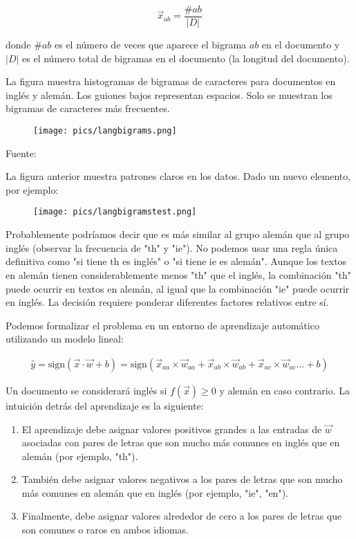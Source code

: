 \begin{equation}
\vec{x}_{ab} = \frac{\#ab}{|D|}
\end{equation}

donde $\#ab$ es el número de veces que aparece el bigrama $ab$ en el documento y $|D|$ es el número total de bigramas en el documento (la longitud del documento).

La figura muestra histogramas de bigramas de caracteres para documentos en inglés y alemán. Los guiones bajos representan espacios. Solo se muestran los bigramas de caracteres más frecuentes.

\begin{figure}[htb]
	\centering
	 \texttt{[image: pics/langbigrams.png]}
\end{figure}

Fuente: \cite{goldberg2017neural}

La figura anterior muestra patrones claros en los datos. Dado un nuevo elemento, por ejemplo:

\begin{figure}[htb]
	\centering
	 \texttt{[image: pics/langbigramstest.png]}
\end{figure}

Probablemente podríamos decir que es más similar al grupo alemán que al grupo inglés (observar la frecuencia de "th" y "ie"). No podemos usar una regla única definitiva como "si tiene th es inglés" o "si tiene ie es alemán". Aunque los textos en alemán tienen considerablemente menos "th" que el inglés, la combinación "th" puede ocurrir en textos en alemán, al igual que la combinación "ie" puede ocurrir en inglés. La decisión requiere ponderar diferentes factores relativos entre sí.

Podemos formalizar el problema en un entorno de aprendizaje automático utilizando un modelo lineal:

\begin{equation}
\begin{split}
\hat{y} = \text{sign}(\vec{x}\cdot \vec{w} + b) = \text{sign}(\vec{x}_{aa}\times \vec{w}_{aa}+ \vec{x}_{ab}\times \vec{w}_{ab}+ \vec{x}_{ac}\times \vec{w}_{ac} \dots +b)
\end{split}
\end{equation}

Un documento se considerará inglés si $f(\vec{x}) \geq 0$ y alemán en caso contrario. La intuición detrás del aprendizaje es la siguiente:

\begin{enumerate}
\item El aprendizaje debe asignar valores positivos grandes a las entradas de $\vec{w}$ asociadas con pares de letras que son mucho más comunes en inglés que en alemán (por ejemplo, "th").
\item También debe asignar valores negativos a los pares de letras que son mucho más comunes en alemán que en inglés (por ejemplo, "ie", "en").
\item Finalmente, debe asignar valores alrededor de cero a los pares de letras que son comunes o raros en ambos idiomas.
\end{enumerate}


